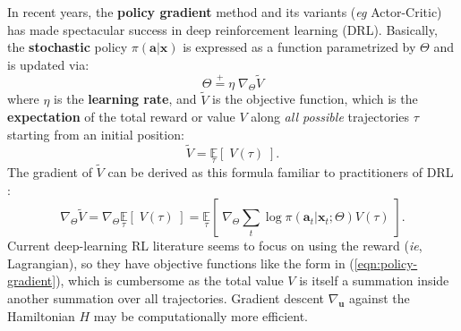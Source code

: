 \documentclass[orivec]{llncs}
\newcommand{\vect}[1]{\boldsymbol{#1}}
\begin{document}
In recent years, the \textbf{policy gradient} method and its variants (\textit{eg} Actor-Critic) has made spectacular success in deep reinforcement learning (DRL).  Basically, the \textbf{stochastic} policy $\pi(\vect{a} | \vect{x})$ is expressed as a function parametrized by $\Theta$ and is updated via:
\begin{equation}
\Theta \stackrel{+}{=} \eta \; \nabla_{\Theta} \widetilde{V}
\end{equation}
where $\eta$ is the \textbf{learning rate}, and $\widetilde{V}$ is the objective function, which is the \textbf{expectation} of the total reward or value $V$ along \textit{all possible} trajectories $\tau$ starting from an initial position:
\begin{equation}
\widetilde{V} = \underset{\tau}{\mathbb{E}}[ \; V(\tau) \;] .
\end{equation}
The gradient of $\widetilde{V}$ can be derived as this formula familiar to practitioners of DRL \cite{Sutton2018}:
\begin{equation}
\label{eqn:policy-gradient}
\nabla_{\Theta} \widetilde{V} = \nabla_{\Theta} \underset{\tau}{\mathbb{E}}[ \; V(\tau) \;] = \underset{\tau}{\mathbb{E}}[ \; \nabla_{\Theta} \sum_t \log \pi(\vect{a}_t | \vect{x}_t; \Theta) V(\tau) \;] .
\end{equation}
Current deep-learning RL literature seems to focus on using the reward (\textit{ie}, Lagrangian), so they have objective functions like the form in (\ref{eqn:policy-gradient}), which is cumbersome as the total value $V$ is itself a summation inside another summation over all trajectories.  Gradient descent $\nabla_{\vect{u}}$ against the Hamiltonian $H$ may be computationally more efficient.



\end{document}
